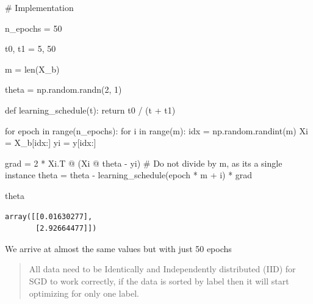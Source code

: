 \documentclass[
]{report}
\newenvironment{Shaded}{\begin{snugshade}}{\end{snugshade}}
\newcommand{\BuiltInTok}[1]{\textcolor[rgb]{0.00,0.23,0.31}{#1}}
\newcommand{\CommentTok}[1]{\textcolor[rgb]{0.37,0.37,0.37}{#1}}
\newcommand{\ControlFlowTok}[1]{\textcolor[rgb]{0.00,0.23,0.31}{#1}}
\newcommand{\DecValTok}[1]{\textcolor[rgb]{0.68,0.00,0.00}{#1}}
\newcommand{\KeywordTok}[1]{\textcolor[rgb]{0.00,0.23,0.31}{#1}}
\newcommand{\NormalTok}[1]{\textcolor[rgb]{0.00,0.23,0.31}{#1}}
\newcommand{\OperatorTok}[1]{\textcolor[rgb]{0.37,0.37,0.37}{#1}}
\begin{document}
\begin{Shaded}
\begin{Highlighting}[]
\CommentTok{\# Implementation}

\NormalTok{n\_epochs }\OperatorTok{=} \DecValTok{50}

\NormalTok{t0, t1 }\OperatorTok{=} \DecValTok{5}\NormalTok{, }\DecValTok{50}

\NormalTok{m }\OperatorTok{=}  \BuiltInTok{len}\NormalTok{(X\_b)}

\NormalTok{theta }\OperatorTok{=}\NormalTok{ np.random.randn(}\DecValTok{2}\NormalTok{, }\DecValTok{1}\NormalTok{)}

\KeywordTok{def}\NormalTok{ learning\_schedule(t):}
    \ControlFlowTok{return}\NormalTok{ t0 }\OperatorTok{/}\NormalTok{ (t }\OperatorTok{+}\NormalTok{ t1)}

\ControlFlowTok{for}\NormalTok{ epoch }\KeywordTok{in} \BuiltInTok{range}\NormalTok{(n\_epochs):}
    \ControlFlowTok{for}\NormalTok{ i }\KeywordTok{in} \BuiltInTok{range}\NormalTok{(m):}
\NormalTok{        idx }\OperatorTok{=}\NormalTok{ np.random.randint(m)}
\NormalTok{        Xi }\OperatorTok{=}\NormalTok{ X\_b[idx:]}
\NormalTok{        yi }\OperatorTok{=}\NormalTok{ y[idx:]}
        
\NormalTok{        grad }\OperatorTok{=} \DecValTok{2} \OperatorTok{*}\NormalTok{ Xi.T }\OperatorTok{@}\NormalTok{ (Xi }\OperatorTok{@}\NormalTok{ theta }\OperatorTok{{-}}\NormalTok{ yi) }\CommentTok{\# Do not divide by m, as it\textquotesingle{}s a single instance}
\NormalTok{        theta }\OperatorTok{=}\NormalTok{ theta }\OperatorTok{{-}}\NormalTok{ learning\_schedule(epoch }\OperatorTok{*}\NormalTok{ m }\OperatorTok{+}\NormalTok{ i) }\OperatorTok{*}\NormalTok{ grad    }
\end{Highlighting}
\end{Shaded}

\begin{Shaded}
\begin{Highlighting}[]
\NormalTok{theta}
\end{Highlighting}
\end{Shaded}

\begin{verbatim}
array([[0.01630277],
       [2.92664477]])
\end{verbatim}

We arrive at almost the same values but with just 50 epochs

\begin{quote}
All data need to be Identically and Independently distributed (IID) for
SGD to work correctly, if the data is sorted by label then it will start
optimizing for only one label.
\end{quote}
\end{document}
